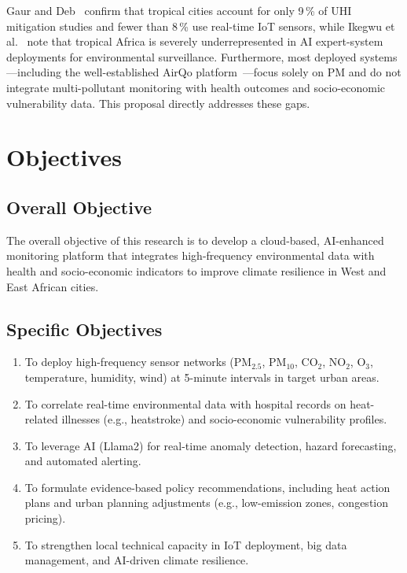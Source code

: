 \documentclass[12pt,a4paper]{report}
\begin{document}
Gaur and Deb~\cite{gaur2026} confirm that tropical cities account for only 9\,\% of UHI mitigation studies and fewer than 8\,\% use real-time IoT sensors, while Ikegwu et al.~\cite{ikegwu2026} note that tropical Africa is severely underrepresented in AI expert-system deployments for environmental surveillance. Furthermore, most deployed systems—including the well-established AirQo platform~\cite{bainomugisha2024}—focus solely on PM and do not integrate multi-pollutant monitoring with health outcomes and socio-economic vulnerability data. This proposal directly addresses these gaps.

\section{Objectives}
\subsection{Overall Objective}
The overall objective of this research is to develop a cloud-based, AI-enhanced monitoring platform that integrates high-frequency environmental data with health and socio-economic indicators to improve climate resilience in West and East African cities.

\subsection{Specific Objectives}
\begin{enumerate}[label=\roman*)]
  \item To deploy high-frequency sensor networks (PM$_{2.5}$, PM$_{10}$, CO$_2$, NO$_2$, O$_3$, temperature, humidity, wind) at 5-minute intervals in target urban areas.
  \item To correlate real-time environmental data with hospital records on heat-related illnesses (e.g., heatstroke) and socio-economic vulnerability profiles.
  \item To leverage AI (Llama2) for real-time anomaly detection, hazard forecasting, and automated alerting.
  \item To formulate evidence-based policy recommendations, including heat action plans and urban planning adjustments (e.g., low-emission zones, congestion pricing).
  \item To strengthen local technical capacity in IoT deployment, big data management, and AI-driven climate resilience.
\end{enumerate}
\end{document}
